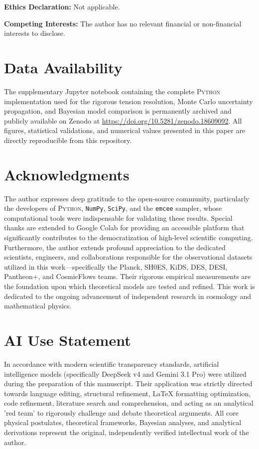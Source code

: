 \documentclass[12pt,a4paper]{article}
\theoremstyle{plain}
\theoremstyle{definition}
\theoremstyle{remark}
\begin{document}
\vspace{0.5em}
\noindent\textbf{Ethics Declaration:} Not applicable.

\vspace{0.5em}
\noindent\textbf{Competing Interests:} The author has no relevant financial or non-financial interests to disclose.

\section*{Data Availability}
The supplementary Jupyter notebook containing the complete \textsc{Python} implementation used for the rigorous tension resolution, Monte Carlo uncertainty propagation, and Bayesian model comparison is permanently archived and publicly available on Zenodo at \url{https://doi.org/10.5281/zenodo.18609092}. All figures, statistical validations, and numerical values presented in this paper are directly reproducible from this repository.

\section*{Acknowledgments}
The author expresses deep gratitude to the open-source community, particularly the developers of \textsc{Python}, \texttt{NumPy}, \texttt{SciPy}, and the \texttt{emcee} sampler, whose computational tools were indispensable for validating these results. Special thanks are extended to Google Colab for providing an accessible platform that significantly contributes to the democratization of high-level scientific computing. Furthermore, the author extends profound appreciation to the dedicated scientists, engineers, and collaborations responsible for the observational datasets utilized in this work---specifically the Planck, SH0ES, KiDS, DES, DESI, Pantheon+, and CosmicFlows teams. Their rigorous empirical measurements are the foundation upon which theoretical models are tested and refined. This work is dedicated to the ongoing advancement of independent research in cosmology and mathematical physics.

\section*{AI Use Statement}
In accordance with modern scientific transparency standards, artificial intelligence models (specifically DeepSeek v4 and Gemini 3.1 Pro) were utilized during the preparation of this manuscript. Their application was strictly directed towards language editing, structural refinement, LaTeX formatting optimization, code refinement, literature search and comprehension, and acting as an analytical 'red team' to rigorously challenge and debate theoretical arguments. All core physical postulates, theoretical frameworks, Bayesian analyses, and analytical derivations represent the original, independently verified intellectual work of the author.
\end{document}
